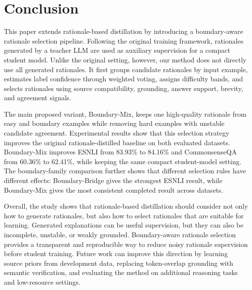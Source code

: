 \section{Conclusion}
\label{sec:conclusion}

This paper extends rationale-based distillation by introducing a boundary-aware rationale selection pipeline. Following the original training framework, rationales generated by a teacher LLM are used as auxiliary supervision for a compact student model. Unlike the original setting, however, our method does not directly use all generated rationales. It first groups candidate rationales by input example, estimates label confidence through weighted voting, assigns difficulty bands, and selects rationales using source compatibility, grounding, answer support, brevity, and agreement signals.

The main proposed variant, Boundary-Mix, keeps one high-quality rationale from easy and boundary examples while removing hard examples with unstable candidate agreement. Experimental results show that this selection strategy improves the original rationale-distilled baseline on both evaluated datasets. Boundary-Mix improves ESNLI from 83.93\% to 84.16\% and CommonsenseQA from 60.36\% to 62.41\%, while keeping the same compact student-model setting. The boundary-family comparison further shows that different selection rules have different effects: Boundary-Bridge gives the strongest ESNLI result, while Boundary-Mix gives the most consistent completed result across datasets.

Overall, the study shows that rationale-based distillation should consider not only how to generate rationales, but also how to select rationales that are suitable for learning. Generated explanations can be useful supervision, but they can also be incomplete, unstable, or weakly grounded. Boundary-aware rationale selection provides a transparent and reproducible way to reduce noisy rationale supervision before student training. Future work can improve this direction by learning source priors from development data, replacing token-overlap grounding with semantic verification, and evaluating the method on additional reasoning tasks and low-resource settings.
